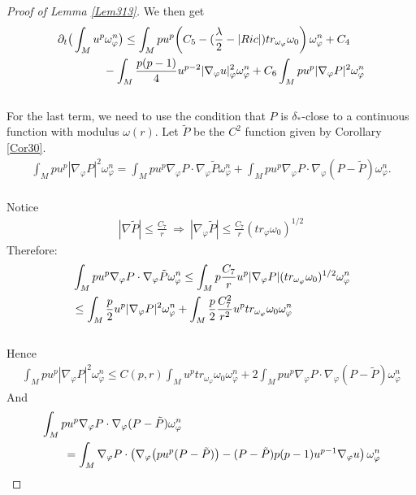 \documentclass[11pt]{amsart}
\numberwithin{equation}{section}
\begin{document}
\begin{proof}[Proof of Lemma \ref{Lem313}]
We then get 
\begin{align}\label{K41}
	&\partial_t\big( \int_M u^p\omega_\varphi^n\big)\le  \int_M pu^p \bigg(C_5 - (\frac{\lambda}{2}-|Ric|)tr_{\omega_{\varphi}}\omega_0 \bigg)\,\omega_\varphi^n +C_4 \notag\\
	&\qquad\qquad  - \int_M \frac{p(p-1)}{4} u^{p-2} |\nabla_\varphi u|^2_\varphi\omega_\varphi^n + C_6\int_M p u^p |\nabla_{\varphi} P|^2 \omega_{\varphi}^n 
\end{align}\\
For the last term, we need to use the condition that $P$ is $\delta_*$-close to a continuous function with modulus $\omega(r)$.  Let $\tilde{P}$ be the $C^2$ function given by Corollary \ref{Cor30}.
\begin{align}\label{K5}
	\int_M p u^p |\nabla_{\varphi} P|^2 \omega_{\varphi}^n = \int_M p u^p \nabla_{\varphi} P \cdot \nabla_{\varphi} \tilde{P} \omega_{\varphi}^n + \int_M p u^p \nabla_{\varphi} P \cdot \nabla_{\varphi}(P - \tilde{P}) \omega_{\varphi}^n.
\end{align}\\
Notice 
\begin{align}
	|\nabla \tilde{P}| \le  \frac{C_{7}}{r}\  \Longrightarrow\  |\nabla_{\varphi} \tilde{P}| \le  \frac{C_{7}}{r} (tr_{\varphi} \omega_0)^{1/2} 
\end{align}
Therefore:
\begin{align}\label{K6}
	&\int_M p u^p \nabla_{\varphi} P \cdot \nabla_{\varphi} \tilde{P} \omega_{\varphi}^n \le  \int_M p \frac{C_{7}}{r} u^p |\nabla_{\varphi} P| (tr_{\omega_{\varphi} }\omega_0)^{1/2} \omega_{\varphi}^n \notag\\
	&\le  \int_M \frac{p}{2} u^p |\nabla_{\varphi} P|^2 \omega_{\varphi}^n + \int_M \frac{p}{2} \frac{C_{7}^2}{r^2} u^p tr_{\omega_{\varphi}} \omega_0 \omega_{\varphi}^n 
\end{align}\\
Hence
\begin{align}
	\int_M p u^p |\nabla_{\varphi} P|^2 \omega_{\varphi}^n \le  C(p,r) \int_M  u^p tr_{\omega_{\varphi} }\omega_0 \omega_{\varphi}^n + 2\int_M p u^p \nabla_{\varphi} P \cdot \nabla_{\varphi}(P - \tilde{P}) \omega_{\varphi}^n 
\end{align}
And
\begin{align}\label{K7}
	&\int_M p u^p \nabla_{\varphi} P \cdot \nabla_{\varphi}(P - \tilde{P}) \omega_{\varphi}^n \notag\\
	&\qquad =  \int_M\nabla_\varphi P\cdot \left(\nabla_\varphi\big( pu^p(P-\tilde P)\big)- (P-\tilde P)p(p-1)u^{p-1} \nabla_{\varphi} u \right) \omega_{\varphi}^n \notag\\

\end{align}
\end{proof}
\end{document}
